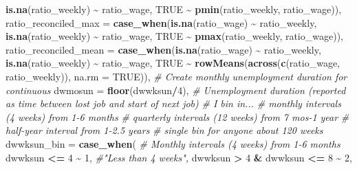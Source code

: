 \documentclass[
]{article}
\newenvironment{Shaded}{\begin{snugshade}}{\end{snugshade}}
\newcommand{\AttributeTok}[1]{\textcolor[rgb]{0.13,0.29,0.53}{#1}}
\newcommand{\CommentTok}[1]{\textcolor[rgb]{0.56,0.35,0.01}{\textit{#1}}}
\newcommand{\ConstantTok}[1]{\textcolor[rgb]{0.56,0.35,0.01}{#1}}
\newcommand{\DecValTok}[1]{\textcolor[rgb]{0.00,0.00,0.81}{#1}}
\newcommand{\FunctionTok}[1]{\textcolor[rgb]{0.13,0.29,0.53}{\textbf{#1}}}
\newcommand{\NormalTok}[1]{#1}
\newcommand{\SpecialCharTok}[1]{\textcolor[rgb]{0.81,0.36,0.00}{\textbf{#1}}}
\begin{document}
\begin{Shaded}
\begin{Highlighting}[]
                                          \FunctionTok{is.na}\NormalTok{(ratio\_weekly) }\SpecialCharTok{\textasciitilde{}}\NormalTok{ ratio\_wage, }
                                          \ConstantTok{TRUE} \SpecialCharTok{\textasciitilde{}} \FunctionTok{pmin}\NormalTok{(ratio\_weekly, ratio\_wage)), }
         \AttributeTok{ratio\_reconciled\_max =} \FunctionTok{case\_when}\NormalTok{(}\FunctionTok{is.na}\NormalTok{(ratio\_wage) }\SpecialCharTok{\textasciitilde{}}\NormalTok{ ratio\_weekly, }
                                          \FunctionTok{is.na}\NormalTok{(ratio\_weekly) }\SpecialCharTok{\textasciitilde{}}\NormalTok{ ratio\_wage, }
                                          \ConstantTok{TRUE} \SpecialCharTok{\textasciitilde{}} \FunctionTok{pmax}\NormalTok{(ratio\_weekly, ratio\_wage)), }
         \AttributeTok{ratio\_reconciled\_mean =} \FunctionTok{case\_when}\NormalTok{(}\FunctionTok{is.na}\NormalTok{(ratio\_wage) }\SpecialCharTok{\textasciitilde{}}\NormalTok{ ratio\_weekly, }
                                          \FunctionTok{is.na}\NormalTok{(ratio\_weekly) }\SpecialCharTok{\textasciitilde{}}\NormalTok{ ratio\_wage, }
                                          \ConstantTok{TRUE} \SpecialCharTok{\textasciitilde{}} \FunctionTok{rowMeans}\NormalTok{(}\FunctionTok{across}\NormalTok{(}\FunctionTok{c}\NormalTok{(ratio\_wage, ratio\_weekly)), }\AttributeTok{na.rm =} \ConstantTok{TRUE}\NormalTok{)), }
         \CommentTok{\# Create monthly unemployment duration for continuous}
         \AttributeTok{dwmosun =} \FunctionTok{floor}\NormalTok{(dwwksun}\SpecialCharTok{/}\DecValTok{4}\NormalTok{),}
         \CommentTok{\# Unemployment duration (reported as time between lost job and start of next job)}
         \CommentTok{\# I bin in...}
         \CommentTok{\# monthly intervals (4 weeks) from 1{-}6 months}
         \CommentTok{\# quarterly intervals (12 weeks) from 7 mos{-}1 year}
         \CommentTok{\# half{-}year interval from 1{-}2.5 years}
         \CommentTok{\# single bin for anyone about 120 weeks}
         \AttributeTok{dwwksun\_bin =} \FunctionTok{case\_when}\NormalTok{(}
           \CommentTok{\# Monthly intervals (4 weeks) from 1{-}6 months}
\NormalTok{           dwwksun }\SpecialCharTok{\textless{}=} \DecValTok{4} \SpecialCharTok{\textasciitilde{}} \DecValTok{1}\NormalTok{, }\CommentTok{\#"Less than 4 weeks",}
\NormalTok{                                 dwwksun }\SpecialCharTok{\textgreater{}} \DecValTok{4} \SpecialCharTok{\&}\NormalTok{ dwwksun }\SpecialCharTok{\textless{}=} \DecValTok{8} \SpecialCharTok{\textasciitilde{}} \DecValTok{2}\NormalTok{,}

\end{Highlighting}
\end{Shaded}
\end{document}
